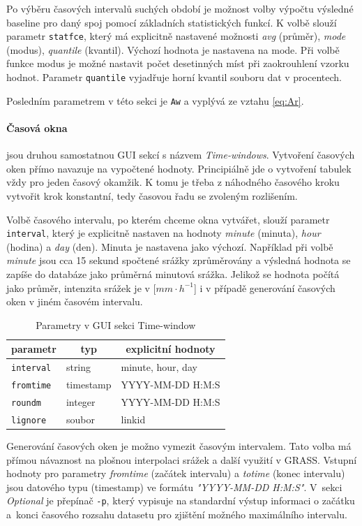 \documentclass[a4paper,12pt,oneside]{report}
\begin{document}
Po výběru časových intervalů suchých období je možnost volby výpočtu výsledné baseline
pro daný spoj pomocí základních statistických funkcí. K volbě slouží
parametr \texttt{statfce}, který má explicitně nastavené možnosti
\emph{avg} (průměr), \emph{mode} (modus), \emph{quantile}
(kvantil). Výchozí hodnota je nastavena na mode. Při volbě funkce
modus je možné nastavit počet desetinných míst při zaokrouhlení vzorku
hodnot. Parametr \texttt{quantile} vyjadřuje horní kvantil souboru dat
v procentech.

Posledním parametrem v této sekci je \texttt{Aw} a vyplývá ze vztahu
\ref{eq:Ar}.


\paragraph*{Časová okna} jsou druhou samostatnou GUI sekcí s názvem
\textit{Time-windows}. Vytvo\-ření časových oken přímo navazuje na
vypočtené hodnoty. Principiálně jde o vytvoření tabulek vždy pro jeden
časový okamžik. K tomu je třeba z náhodného časového kroku vytvořit
krok konstantní, tedy časovou řadu se zvoleným rozlišením.

Volbě časového intervalu, po kterém chceme okna vytvářet, slouží
parametr \texttt{interval}, který je explicitně nastaven na hodnoty
\emph{minute} (minuta), \emph{hour} (hodina) a \emph{day}
(den). Minuta je nastavena jako výchozí.  Například při volbě
\emph{minute} jsou cca 15 sekund spočtené srážky zprůměrovány a výsledná
hodnota se zapíše do databáze jako průměrná minutová srážka. Jelikož
se hodnota počítá jako průměr, intenzita srážek je v [$mm \cdot
h^{-1}$] i v případě generování časových oken v jiném časovém
intervalu.
\begin{table}[h]
\centering
\begin{tabular}{|lll|}
\hline
\multicolumn{1}{|c}{parametr} & \multicolumn{1}{c}{typ} & \multicolumn{1}{c|}{explicitní hodnoty} \\ \hline\hline
{\tt interval}                               & string                  & minute, hour, day             \\
{\tt fromtime}                               & timestamp               & YYYY-MM-DD H:M:S              \\
{\tt roundm}                                 & integer                 & YYYY-MM-DD H:M:S              \\
{\tt lignore}                                & soubor                  & linkid                        \\ \hline
\end{tabular}
\caption{Parametry v GUI sekci Time-window}
\label{my-label}
\end{table}
Generování časových oken je možno vymezit časovým intervalem. Tato
volba má přímou návaznost na plošnou interpolaci srážek a další
využití v GRASS. Vstupní hodnoty pro parametry \textit{fromtime}
(začátek intervalu) a \textit{totime} (konec intervalu) jsou datového
typu (timestamp) ve formátu \emph{"YYYY-MM-DD H:M:S"}. V~sekci
\textit{Optional} je přepínač \texttt{-p}, který vypisuje na
standardní výstup informaci o začátku a~konci časového rozsahu
datasetu pro zjištění možného maximálního intervalu.
\end{document}
